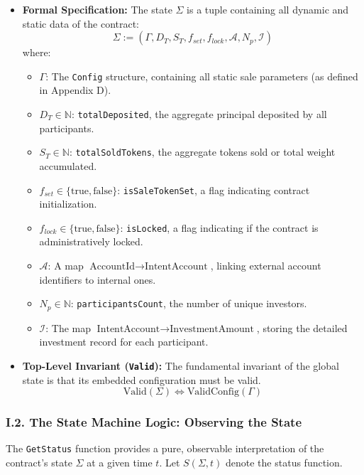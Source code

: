\documentclass[
  english,
  onecolumn]{article}
\providecommand{\tightlist}{%
  \setlength{\itemsep}{0pt}\setlength{\parskip}{0pt}}
\begin{document}
\begin{itemize}
\tightlist
\item
  \textbf{Formal Specification:} The state \(\Sigma\) is a tuple
  containing all dynamic and static data of the contract:
  \[ \Sigma := (\Gamma, D_T, S_T, f_{set}, f_{lock}, \mathcal{A}, N_p, \mathcal{I}) \]
  where:

  \begin{itemize}
  \tightlist
  \item
    \(\Gamma\): The \texttt{Config} structure, containing all static
    sale parameters (as defined in Appendix D).
  \item
    \(D_T \in \mathbb{N}\): \texttt{totalDeposited}, the aggregate
    principal deposited by all participants.
  \item
    \(S_T \in \mathbb{N}\): \texttt{totalSoldTokens}, the aggregate
    tokens sold or total weight accumulated.
  \item
    \(f_{set} \in \{ \text{true}, \text{false} \}\):
    \texttt{isSaleTokenSet}, a flag indicating contract initialization.
  \item
    \(f_{lock} \in \{ \text{true}, \text{false} \}\): \texttt{isLocked},
    a flag indicating if the contract is administratively locked.
  \item
    \(\mathcal{A}\): A map
    \(\text{AccountId} \to \text{IntentAccount}\), linking external
    account identifiers to internal ones.
  \item
    \(N_p \in \mathbb{N}\): \texttt{participantsCount}, the number of
    unique investors.
  \item
    \(\mathcal{I}\): The map
    \(\text{IntentAccount} \to \text{InvestmentAmount}\), storing the
    detailed investment record for each participant.
  \end{itemize}
\item
  \textbf{Top-Level Invariant (\texttt{Valid}):} The fundamental
  invariant of the global state is that its embedded configuration must
  be valid. \[ \text{Valid}(\Sigma) \iff \text{ValidConfig}(\Gamma) \]
\end{itemize}

\subsubsection{I.2. The State Machine Logic: Observing the
State}\label{i.2.-the-state-machine-logic-observing-the-state}

The \texttt{GetStatus} function provides a pure, observable
interpretation of the contract's state \(\Sigma\) at a given time \(t\).
Let \(S(\Sigma, t)\) denote the status function.
\end{document}
